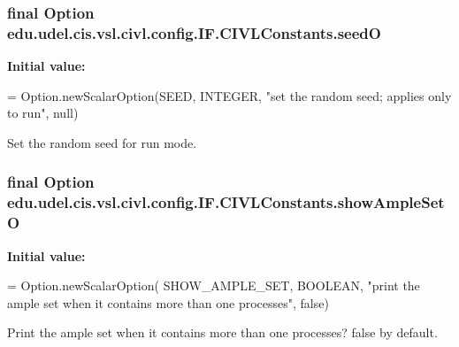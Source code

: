 \subsubsection[{seed\+O}]{\setlength{\rightskip}{0pt plus 5cm}final Option edu.\+udel.\+cis.\+vsl.\+civl.\+config.\+I\+F.\+C\+I\+V\+L\+Constants.\+seed\+O\hspace{0.3cm}{\ttfamily [static]}}\label{classedu_1_1udel_1_1cis_1_1vsl_1_1civl_1_1config_1_1IF_1_1CIVLConstants_ad1d435f50cd553d105059ce1a183696a}
{\bfseries Initial value\+:}
\begin{DoxyCode}
= Option.newScalarOption(SEED, INTEGER,
            \textcolor{stringliteral}{"set the random seed; applies only to run"}, null)
\end{DoxyCode}


Set the random seed for run mode. 

\hypertarget{classedu_1_1udel_1_1cis_1_1vsl_1_1civl_1_1config_1_1IF_1_1CIVLConstants_a0182732f0052855a760e031dfe7b6217}{}
\subsubsection[{show\+Ample\+Set\+O}]{\setlength{\rightskip}{0pt plus 5cm}final Option edu.\+udel.\+cis.\+vsl.\+civl.\+config.\+I\+F.\+C\+I\+V\+L\+Constants.\+show\+Ample\+Set\+O\hspace{0.3cm}{\ttfamily [static]}}\label{classedu_1_1udel_1_1cis_1_1vsl_1_1civl_1_1config_1_1IF_1_1CIVLConstants_a0182732f0052855a760e031dfe7b6217}
{\bfseries Initial value\+:}
\begin{DoxyCode}
= Option.newScalarOption(
            SHOW\_AMPLE\_SET, BOOLEAN,
            \textcolor{stringliteral}{"print the ample set when it contains more than one processes"},
            \textcolor{keyword}{false})
\end{DoxyCode}


Print the ample set when it contains more than one processes? false by default. 

\hypertarget{classedu_1_1udel_1_1cis_1_1vsl_1_1civl_1_1config_1_1IF_1_1CIVLConstants_af4bda824bd19eb7b681e4cdf2bcea519}{}
